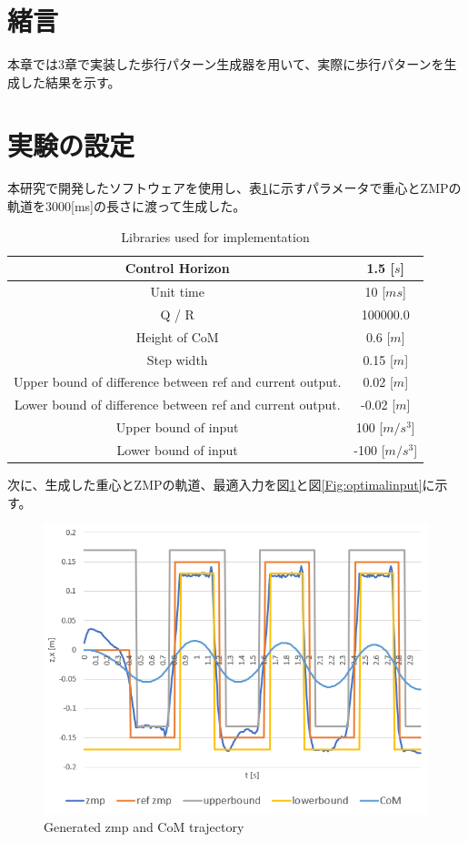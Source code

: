 \section{緒言}
本章では3章で実装した歩行パターン生成器を用いて、実際に歩行パターンを生成した結果を示す。
\section{実験の設定}
本研究で開発したソフトウェアを使用し、表\ref{tb:parametor}に示すパラメータで重心とZMPの軌道を3000[ms]の長さに渡って生成した。

\begin{table}[htbp]
  \centering
  \begin{tabular}{|c|c|} \hline
    Control Horizon & 1.5 [$s$] \\ \hline
    Unit time &10 [$ms$] \\ \hline
    Q / R  & 100000.0 \\ \hline
    Height of CoM & 0.6 [$m$] \\ \hline
    Step width & 0.15 [$m$] \\ \hline
    Upper bound of difference between ref and current output. & 0.02 [$m$] \\ \hline
    Lower bound of difference between ref and current output. & -0.02 [$m$] \\ \hline
    Upper bound of input & 100 [$m/s^{3}$] \\ \hline
    Lower bound of input & -100 [$m/s^{3}$] \\ \hline
  \end{tabular}
  \caption{Libraries used for implementation}
  \label{tb:parametor}
\end{table}

\newpage

次に、生成した重心とZMPの軌道、最適入力を図\ref{Fig:zmptrajectory}と図\ref{Fig:optimalinput}に示す。

\begin{figure}[hbtp]
  \centering
 \includegraphics[keepaspectratio, scale=0.6]
      {images/zmp_trajectory.png}
 \caption{Generated zmp and CoM trajectory }
 \label{Fig:zmptrajectory}
\end{figure}

